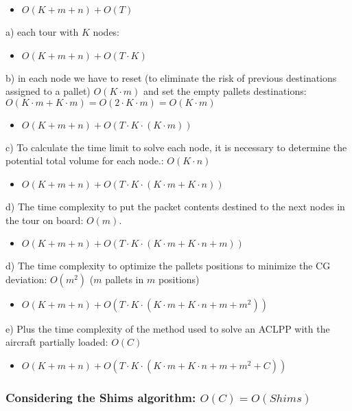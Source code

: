 \documentclass[preprint,authoryear]{elsarticle}
\begin{document}
{\begin{itemize}
	\item $O(K + m + n) + O(T)$
\end{itemize}


a) each tour with $K$ nodes:
\begin{itemize}
	\item $O(K + m + n) + O(T \cdot K)$
\end{itemize}


b) in each node we have to reset (to eliminate the risk of previous destinations assigned to a pallet) $O(K \cdot m)$ and set the empty pallets destinations: $O(K \cdot m + K \cdot m) = O(2 \cdot K \cdot m) = O(K \cdot m)$
\begin{itemize}
	\item $O(K + m + n) + O(T \cdot K \cdot (K \cdot m))$
\end{itemize}

c) To calculate the time limit to solve each node, it is necessary to determine the potential total volume for each node.: $O(K \cdot n)$
\begin{itemize}
	\item $O(K + m + n) + O(T \cdot K \cdot (K \cdot m + K \cdot n))$
\end{itemize}

d) The time complexity to put the packet contents destined to the next nodes in the tour on board: $O(m)$.
\begin{itemize}
	\item $O(K + m + n) + O(T \cdot K \cdot (K \cdot m + K \cdot n + m))$
\end{itemize}

d) The time complexity to optimize the pallets positions to minimize the CG deviation: $O(m^2)$ ($m$ pallets in $m$ positions)
\begin{itemize}
	\item $O(K + m + n) + O(T \cdot K \cdot (K \cdot m + K \cdot n + m + m^2))$
\end{itemize}

e) Plus the time complexity of the method used to solve an ACLPP with the aircraft partially loaded: $O(C)$
\begin{itemize}
	\item $O(K + m + n) + O(T \cdot K \cdot (K \cdot m + K \cdot n + m + m^2 + C))$
\end{itemize}

\subsubsection{Considering the Shims algorithm: $O(C) = O(Shims)$}

}
\end{document}
